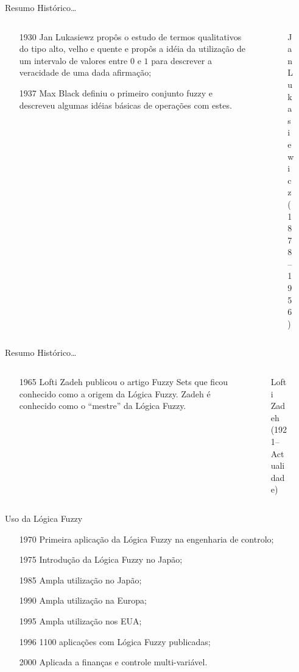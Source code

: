 \documentclass[portuges]{beamer}
\begin{document}
\begin{frame}{Resumo Histórico\ldots}

   \begin{columns}
	\begin{column}{7cm}
	\begin{itemize}[<+->]
		\item[1930] Jan Lukasiewz propôs o estudo de termos qualitativos do tipo alto, velho e quente 
		e propôs a idéia da utilização de um intervalo de valores entre $0$ e $1$ para descrever a veracidade
		de uma dada afirmação;
		\item[1937] Max Black definiu o primeiro conjunto fuzzy e descreveu algumas idéias básicas de operações com estes.
	\end{itemize}
	\end{column}
	\begin{column}{4cm}
		\begin{figure}
			\centering
			\caption{Jan Lukasiewicz (1878--1956)}
		\end{figure}
	\end{column}	
   \end{columns}
\end{frame}

\begin{frame}{Resumo Histórico\ldots}
   \begin{columns}
	\begin{column}{7cm}
	\begin{itemize}[<+->]
		\item[1965] Lofti Zadeh publicou o artigo Fuzzy Sets que ficou
		conhecido como a origem da Lógica Fuzzy. Zadeh é conhecido como
		o ``mestre'' da Lógica Fuzzy.
	\end{itemize}
	\end{column}
	\begin{column}{4cm}
		\begin{figure}
			\centering
			\caption{Lofti Zadeh (1921--Actualidade)}
		\end{figure}
	\end{column}	
   \end{columns}
\end{frame}

\begin{frame}{Uso da Lógica Fuzzy}
\begin{itemize}
	\item[1970] Primeira aplicação da Lógica Fuzzy na engenharia de controlo;
	\item[1975] Introdução da Lógica Fuzzy no Japão;
        \item[1985] Ampla utilização no Japão;
        \item[1990] Ampla utilização na Europa;
        \item[1995] Ampla utilização nos EUA;
        \item[1996] 1100 aplicações com Lógica Fuzzy publicadas; 
	\item[2000] Aplicada a finanças e controle multi-variável.
\end{itemize}
\end{frame}
\end{document}
